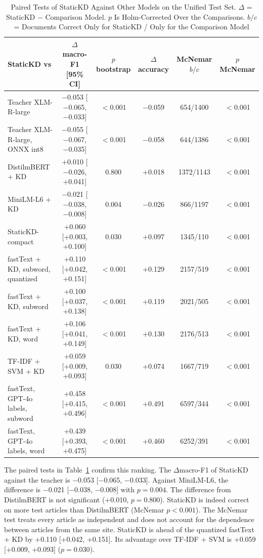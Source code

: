 \documentclass[journal]{IEEEtran}
\begin{document}
\begin{table}[!t]
\caption{Paired Tests of StaticKD Against Other Models on the Unified Test Set. $\Delta$ = StaticKD $-$ Comparison Model. $p$ Is Holm-Corrected Over the Comparisons. $b/c$ = Documents Correct Only for StaticKD / Only for the Comparison Model}
\label{tab:sig}
\centering
\footnotesize
\begin{tabular}{@{}lccccc@{}}
\toprule
StaticKD vs & $\Delta$macro-F1 [95\% CI] & $p$ bootstrap & $\Delta$accuracy & McNemar $b/c$ & $p$ McNemar \\
\midrule
Teacher XLM-R-large & $-$0.053 [$-$0.065, $-$0.033] & $<$0.001 & $-$0.059 & 654/1400 & $<$0.001 \\
Teacher XLM-R-large, ONNX int8 & $-$0.055 [$-$0.067, $-$0.035] & $<$0.001 & $-$0.058 & 644/1386 & $<$0.001 \\
DistilmBERT + KD & +0.010 [$-$0.026, +0.041] & 0.800 & +0.018 & 1372/1143 & $<$0.001 \\
MiniLM-L6 + KD & $-$0.021 [$-$0.038, $-$0.008] & 0.004 & $-$0.026 & 866/1197 & $<$0.001 \\
StaticKD-compact & +0.060 [+0.003, +0.100] & 0.030 & +0.097 & 1345/110 & $<$0.001 \\
fastText + KD, subword, quantized & +0.110 [+0.042, +0.151] & $<$0.001 & +0.129 & 2157/519 & $<$0.001 \\
fastText + KD, subword & +0.100 [+0.037, +0.138] & $<$0.001 & +0.119 & 2021/505 & $<$0.001 \\
fastText + KD, word & +0.106 [+0.041, +0.149] & $<$0.001 & +0.130 & 2176/513 & $<$0.001 \\
TF-IDF + SVM + KD & +0.059 [+0.009, +0.093] & 0.030 & +0.074 & 1667/719 & $<$0.001 \\
fastText, GPT-4o labels, subword & +0.458 [+0.415, +0.496] & $<$0.001 & +0.491 & 6597/344 & $<$0.001 \\
fastText, GPT-4o labels, word & +0.439 [+0.393, +0.475] & $<$0.001 & +0.460 & 6252/391 & $<$0.001 \\
\bottomrule
\end{tabular}
\end{table}
The paired tests in Table~\ref{tab:sig} confirm this ranking. The $\Delta$macro-F1 of StaticKD against the teacher is $-$0.053 [$-$0.065, $-$0.033]. Against MiniLM-L6, the difference is $-$0.021 [$-$0.038, $-$0.008] with $p=0.004$. The difference from DistilmBERT is not significant (+0.010, $p=0.800$). StaticKD is indeed correct on more test articles than DistilmBERT (McNemar $p<0.001$). The McNemar test treats every article as independent and does not account for the dependence between articles from the same site. StaticKD is ahead of the quantized fastText + KD by +0.110 [+0.042, +0.151]. Its advantage over TF-IDF + SVM is +0.059 [+0.009, +0.093] ($p=0.030$).
\end{document}
